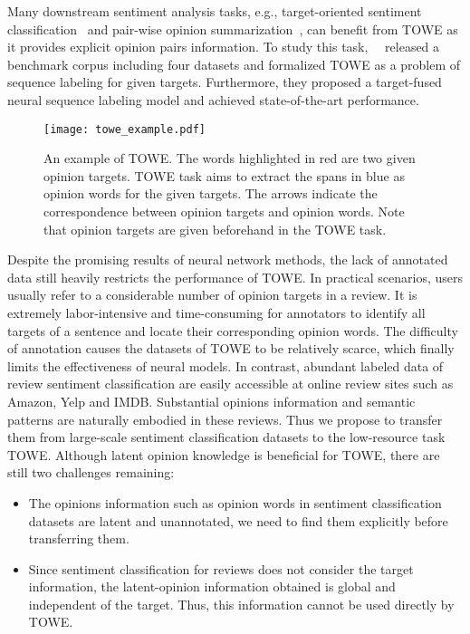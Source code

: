 \documentclass[letterpaper]{article} \usepackage{aaai20}  \usepackage{times}  \usepackage{helvet} \usepackage{courier}  \usepackage[hyphens]{url}  \usepackage{graphicx} \urlstyle{rm} \def\UrlFont{\rm}  \usepackage{graphicx}
\begin{document}
Many downstream sentiment analysis tasks, e.g., target-oriented sentiment classification~\cite{DBLP:conf/coling/TangQFL16,DBLP:conf/emnlp/WangHZZ16,DBLP:conf/acl/LiX18} and pair-wise opinion summarization~\cite{DBLP:conf/kdd/HuL04,DBLP:conf/cikm/ZhuangJZ06,DBLP:conf/coling/LiHHZXZY10}, can benefit from TOWE as it provides explicit opinion pairs information. To study this task,~\citeauthor{DBLP:conf/naacl/FanWDHC19}~ released a benchmark corpus including four datasets and formalized TOWE as a problem of sequence labeling for given targets. Furthermore, they proposed a target-fused neural sequence labeling model and achieved state-of-the-art performance.

\begin{figure}[t]
	\centering
	\texttt{[image: towe\_example.pdf]}
	\caption{An example of TOWE. The words highlighted in red are two given opinion targets. TOWE task aims to extract the spans in blue as opinion words for the given targets. The arrows indicate the correspondence between opinion targets and opinion words. Note that opinion targets are given beforehand in the TOWE task.}
	\label{fig:towesample}
\end{figure}

Despite the promising results of neural network methods, the lack of annotated data still heavily restricts the performance of TOWE. In practical scenarios, users usually refer to a considerable number of opinion targets in a review. It is extremely labor-intensive and time-consuming for annotators to identify all targets of a sentence and locate their corresponding opinion words. The difficulty of annotation causes the datasets of TOWE to be relatively scarce, which finally limits the effectiveness of neural models. In contrast, abundant labeled data of review sentiment classification are easily accessible at online review sites such as Amazon, Yelp and IMDB. Substantial opinions information and semantic patterns are naturally embodied in these reviews. Thus we propose to transfer them from large-scale sentiment classification datasets to the low-resource task TOWE. Although latent opinion knowledge is beneficial for TOWE, there are still two challenges remaining:

\begin{itemize}
	\item The opinions information such as opinion words in sentiment classification datasets are latent and unannotated, we need to find them explicitly before transferring them. 
	\item Since sentiment classification for reviews does not consider the target information, the latent-opinion information obtained is global and independent of the target. Thus, this information cannot be used directly by TOWE.
\end{itemize}
\end{document}

